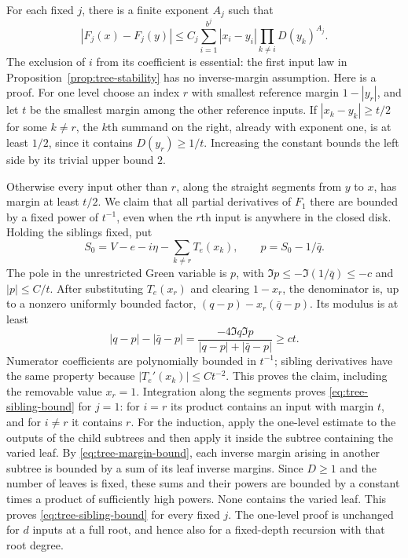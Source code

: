 For each fixed $j$, there is a finite exponent $A_j$ such that
\begin{equation}\label{eq:tree-sibling-bound}
 |F_j(x)-F_j(y)|
 \le C_j\sum_{i=1}^{b^j}|x_i-y_i|
                    \prod_{k\ne i}D(y_k)^{A_j}.
\end{equation}
The exclusion of $i$ from its coefficient is essential: the first
input law in Proposition~\ref{prop:tree-stability} has no inverse-margin
assumption.  Here is a proof.  For one level choose an index $r$ with
smallest reference margin $1-|y_r|$, and let $t$ be the smallest
margin among the other reference inputs.  If
$|x_k-y_k|\ge t/2$ for some $k\ne r$, the $k$th summand on the right,
already with exponent one, is at least $1/2$, since it contains
$D(y_r)\ge1/t$.  Increasing the constant bounds the left side by its
trivial upper bound $2$.

Otherwise every input other than $r$, along the straight segments
from $y$ to $x$, has margin at least $t/2$.  We claim that all partial
derivatives of $F_1$ there are bounded by a fixed power of $t^{-1}$,
even when the $r$th input is anywhere in the closed disk.  Holding
the siblings fixed, put
\[
 S_0=V-e-i\eta-\sum_{k\ne r}T_e(x_k),\qquad
 p=S_0-1/\bar q.
\]
The pole in the unrestricted Green variable is $p$, with
$\Im p\le-\Im(1/\bar q)\le-c$ and $|p|\le C/t$.
After substituting $T_e(x_r)$ and clearing $1-x_r$, the denominator
is, up to a nonzero uniformly bounded factor,
$(q-p)-x_r(\bar q-p)$.  Its modulus is at least
\[
 |q-p|-|\bar q-p|
 =\frac{-4\Im q\Im p}{|q-p|+|\bar q-p|}\ge ct.
\]
Numerator coefficients are polynomially bounded in $t^{-1}$;
sibling derivatives have the same property because
$|T_e'(x_k)|\le Ct^{-2}$.  This proves the claim, including the
removable value $x_r=1$.  Integration along the segments proves
\eqref{eq:tree-sibling-bound} for $j=1$: for $i=r$ its product
contains an input with margin $t$, and for $i\ne r$ it contains $r$.
For the induction, apply the one-level estimate to the outputs of
the child subtrees and then apply it inside the subtree containing
the varied leaf.  By \eqref{eq:tree-margin-bound}, each inverse
margin arising in another subtree is bounded by a sum of its leaf
inverse margins.  Since $D\ge1$ and the number of leaves is fixed,
these sums and their powers are bounded by a constant times a product
of sufficiently high powers.  None contains the varied leaf.  This
proves \eqref{eq:tree-sibling-bound} for every fixed $j$.
The one-level proof is unchanged for $d$ inputs at a full root,
and hence also for a fixed-depth recursion with that root degree.

